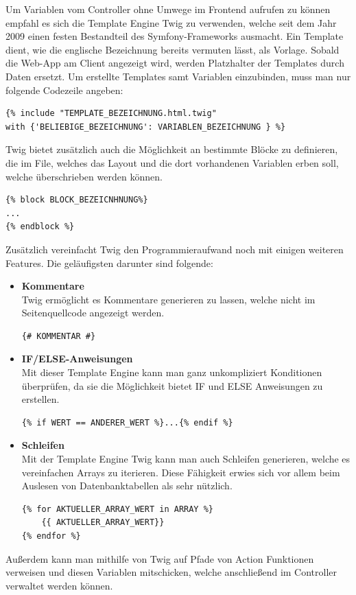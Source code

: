 Um Variablen vom Controller ohne Umwege im Frontend aufrufen zu können empfahl es sich die Template Engine {Twig\cite{twig}} zu verwenden, welche seit dem Jahr 2009 einen festen Bestandteil des Symfony-Frameworks ausmacht. Ein Template dient, wie die englische Bezeichnung bereits vermuten lässt, als Vorlage. Sobald die Web-App am Client angezeigt wird, werden Platzhalter der Templates durch Daten ersetzt.
Um erstellte Templates samt Variablen einzubinden, muss man nur folgende Codezeile angeben:
	\lstset{language = php}
  	\begin{lstlisting}
{% include "TEMPLATE_BEZEICHNUNG.html.twig"
with {'BELIEBIGE_BEZEICHNUNG': VARIABLEN_BEZEICHNUNG } %}
  	\end{lstlisting}
  	Twig bietet zusätzlich auch die Möglichkeit an bestimmte Blöcke zu definieren, die im File, welches das Layout und die dort vorhandenen Variablen erben soll, welche überschrieben werden können.
	\lstset{language = php}
  	\begin{lstlisting}
{% block BLOCK_BEZEICNHNUNG%}
...
{% endblock %}
	\end{lstlisting}
Zusätzlich vereinfacht Twig den Programmieraufwand noch mit einigen weiteren Features. Die geläufigsten darunter sind folgende:
\begin{itemize}
    \item \textbf{Kommentare}\\
Twig ermöglicht es Kommentare generieren zu lassen, welche nicht im Seitenquellcode angezeigt werden.
\lstset{language = html}
  	\begin{lstlisting}
{# KOMMENTAR #}
	\end{lstlisting}
    \item \textbf{IF/ELSE-Anweisungen}\\
Mit dieser Template Engine kann man ganz unkompliziert Konditionen überprüfen, da sie die Möglichkeit bietet IF und ELSE Anweisungen zu erstellen.
\lstset{language = php}
  	\begin{lstlisting}
{% if WERT == ANDERER_WERT %}...{% endif %}
	\end{lstlisting}
    \item \textbf{Schleifen}\\
Mit der Template Engine Twig kann man auch Schleifen generieren, welche es vereinfachen Arrays zu iterieren. Diese Fähigkeit erwies sich vor allem beim Auslesen von Datenbanktabellen als sehr nützlich.
\lstset{language = php}
  	\begin{lstlisting}
{% for AKTUELLER_ARRAY_WERT in ARRAY %}
	{{ AKTUELLER_ARRAY_WERT}}
{% endfor %}
	\end{lstlisting}
  \end{itemize}
Außerdem kann man mithilfe von Twig auf Pfade von Action Funktionen verweisen und diesen Variablen mitschicken, welche anschließend im Controller verwaltet werden können.

